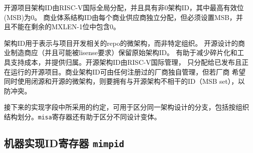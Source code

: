 \iffalse
Open-source project architecture IDs are allocated globally by
RISC-V International, and have non-zero architecture IDs with a zero
most-significant-bit (MSB).  Commercial architecture IDs are allocated
by each commercial vendor independently, but must have the MSB set and
cannot contain zero in the remaining MXLEN-1 bits.
\fi

开源项目架构ID由RISC-V国际全局分配，并且具有非0架构ID，其中最高有效位(MSB)为0。
商业体系结构ID由每个商业供应商独立分配，但必须设置MSB，并且不能在剩余的MXLEN-1位中包含0。

\iffalse
\begin{commentary}
The intent is for the architecture ID to represent the
microarchitecture associated with the repo around which development
occurs rather than a particular organization.  Commercial fabrications
of open-source designs should (and might be required by the license
to) retain the original architecture ID.  This will aid in reducing
fragmentation and tool support costs, as well as provide attribution.
Open-source architecture IDs are administered by RISC-V International
and should only be allocated to released, functioning open-source
projects.  Commercial architecture IDs can be managed independently by
any registered vendor but are required to have IDs disjoint from the
open-source architecture IDs (MSB set) to prevent collisions if a
vendor wishes to use both closed-source and open-source
microarchitectures.

The convention adopted within the following Implementation field can
be used to segregate branches of the same architecture design,
including by organization.  The {\tt misa} register also helps
distinguish different variants of a design.
\end{commentary}
\fi

\begin{commentary}
架构ID用于表示与项目开发相关的repo的微架构，而非特定组织。
开源设计的商业制造商应（并且可能被lisense要求）保留原始架构ID。
有助于减少碎片化和工具支持成本，并提供归属。开源架构ID由RISC-V国际管理，
只分配给已发布且正在运行的开源项目。商业架构ID可由任何注册过的厂商独自管理，但若厂商
希望同时使用闭源和开源的微架构，则要拥有与开源架构不相干的ID（MSB set），以防冲突。

接下来的实现字段中所采用的约定，可用于区分同一架构设计的分支，包括按组织结构划分。{\tt misa}寄存器还有助于区分不同设计变体。
\end{commentary}

\subsection{机器实现ID寄存器 {\tt mimpid}}

